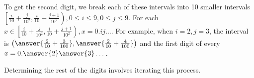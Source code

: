 \documentclass{ximera}
\begin{document}
To get the second digit, we break each of these intervals into 10 smaller intervals $\left[\frac{i}{10}+\frac{j}{10^2},\frac{i}{10}+\frac{j+1}{10^2}\right), 0\leq i\leq 9,0\leq j\leq 9$. For each $x\in\left[\frac{i}{10}+\frac{j}{10^2},\frac{i}{10}+\frac{j+1}{10^2}\right), x=0.ij\dots.$ For example, when $i=2,j=3$, the interval is $\left(\answer{\frac{2}{10}+\frac{3}{100}},\answer{\frac{2}{10}+\frac{4}{100}}\right)$ and the first digit of every $x=0.\answer{2}\answer{3}\dots$.

Determining the rest of the digits involves iterating this process.
\end{document}
